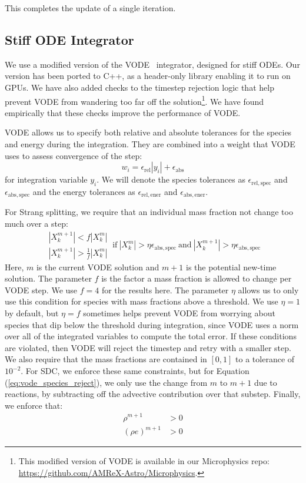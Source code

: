 \documentclass[linenumbers]{aastex631}
\newcommand{\atolspec}{{\epsilon_\mathrm{abs,spec}}}
\newcommand{\rtolspec}{{\epsilon_\mathrm{rel,spec}}}
\newcommand{\atolener}{{\epsilon_\mathrm{abs,ener}}}
\newcommand{\rtolener}{{\epsilon_\mathrm{rel,ener}}}
\begin{document}
This completes the update of a single iteration.

\subsection{Stiff ODE Integrator}\label{sec:VODE}

We use a modified version of the VODE~\citep{vode} integrator,
designed for stiff ODEs.  Our version has been ported to C++, as a
header-only library enabling it to run on GPUs.  We have also added
checks to the timestep rejection logic that help prevent VODE from
wandering too far off the solution\footnote{This modified version of
VODE is available in our Microphysics repo:
\url{https://github.com/AMReX-Astro/Microphysics}.}.  We have found empirically that these checks improve the performance of VODE.

VODE allows us to specify both relative and absolute tolerances
for the species and energy during the integration.  They are combined
into a weight that VODE uses to assess convergence of the step:
\begin{equation}
w_i = \epsilon_\mathrm{rel} |y_i| + \epsilon_\mathrm{abs}
\end{equation}
for integration variable $y_i$.  We will denote the species tolerances
as $\rtolspec$ and $\atolspec$ and the energy tolerances as $\rtolener$ and
$\atolener$.

For Strang splitting, we require that
an individual mass fraction not change too much over a step:
\begin{equation}
\label{eq:vode_species_reject}
\begin{array}{c}|X_k^{m+1}| < f |X_k^m| \\ |X_k^{m+1}| > \frac{1}{f} |X_k^m| \end{array} ~  \mbox{if}~ |X_k^m| > \eta \atolspec ~\mbox{and}~ |X_k^{m+1}| > \eta \atolspec
\end{equation}
Here, $m$ is the current VODE solution and $m+1$ is the potential
new-time solution.  The parameter $f$ is the factor a mass fraction is
allowed to change per VODE step.  We use $f = 4$ for the results here.
The parameter $\eta$ allows us to only use this condition for species
with mass fractions above a threshold.  We use $\eta = 1$ by default,
but $\eta = f$ sometimes helps prevent VODE from worrying about
species that dip below the threshold during integration, since VODE
uses a norm over all of the integrated variables to compute the total
error.  If these conditions are violated, then VODE will reject the
timestep and retry with a smaller step.  We also require that the mass
fractions are contained in $[0, 1]$ to a tolerance of $10^{-2}$.
For SDC, we enforce these same constraints, but for
Equation (\ref{eq:vode_species_reject}), we only use the change from $m$ to $m+1$ due
to reactions, by subtracting off the advective contribution over that substep.
Finally, we enforce that:
\begin{align}
\rho^{m+1} &> 0 \\
(\rho e)^{m+1} &> 0
\end{align}
\end{document}
